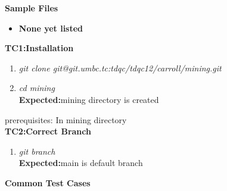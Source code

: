 \documentclass{article}
\begin{document}
\noindent\Large\textbf{Sample Files}
\begin{itemize}
  \item \textbf{None yet listed}\\
\end{itemize}

\Large\textbf{TC1:Installation}
\begin{enumerate}
    \item \textit{git clone git@git.umbc.tc:tdqc/tdqc12/carroll/mining.git}
    \item \textit{cd mining}\\
    \textbf{Expected:}{mining directory is created}\\
\end{enumerate}
\large{prerequisites: In mining directory}\\
\Large\textbf{TC2:Correct Branch}
\begin{enumerate}
    \item \textit{git branch}\\
    \textbf{Expected:}{main is default branch}
\end{enumerate}

\noindent\huge\textbf{Common Test Cases}\\
\end{document}
